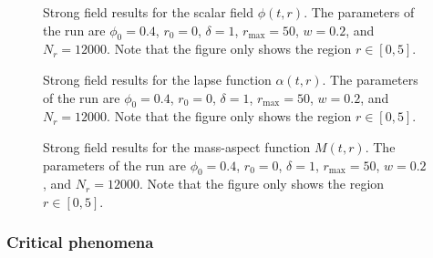 \documentclass[a4paper,11pt]{article}
\renewcommand{\a}{\alpha}
\begin{document}
\begin{figure}[ht]
  \centering
  
  \caption[New strong field results for the scalar field $\phi(t,r)$.]{Strong field results for the scalar field $\phi(t,r)$. The parameters of the run are $\phi_{0}=0.4$, $r_{0}=0$, $\delta=1$, $r_{\max}=50$, $w=0.2$, and $N_{r}=12000$. Note that the figure only shows the region $r\in[0,5]$.}
  \label{fig:phi_strong_new}
\end{figure}

\begin{figure}[ht]
  \centering
  
  \caption[New strong field results for the lapse function $\a(t,r)$.]{Strong field results for the lapse function $\a(t,r)$. The parameters of the run are $\phi_{0}=0.4$, $r_{0}=0$, $\delta=1$, $r_{\max}=50$, $w=0.2$, and $N_{r}=12000$. Note that the figure only shows the region $r\in[0,5]$.}
  \label{fig:alpha_strong_new}
\end{figure}

\begin{figure}[ht]
  \centering
  
  \caption[New strong field results for the mass-aspect function $M(t,r)$.]{Strong field results for the mass-aspect function $M(t,r)$. The parameters of the run are $\phi_{0}=0.4$, $r_{0}=0$, $\delta=1$, $r_{\max}=50$, $w=0.2$, and $N_{r}=12000$. Note that the figure only shows the region $r\in[0,5]$.}
  \label{fig:mass_strong_new}
\end{figure}

\subsubsection{Critical phenomena}



\clearpage
{}
\printbibliography
\end{document}

